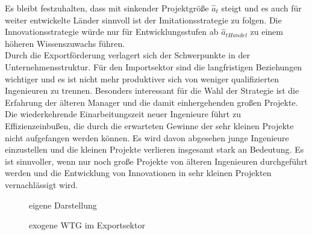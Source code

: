 %
Es bleibt festzuhalten, dass mit sinkender Projektgröße  $\hat{a}_t$ steigt und es auch für weiter entwickelte Länder sinnvoll ist der \textcolor[rgb]{0,0.32,0}{Imitationsstrategie} zu folgen. Die \textcolor[rgb]{0.74,0.97,0.22}{Innovationsstrategie} würde nur für Entwicklungsstufen ab $\hat{a}_{tHandel}$ zu einem höheren Wissenszuwachs führen. \\
%
Durch die Exportförderung verlagert sich der Schwerpunkte in der Unternehmensstruktur. Für den Importsektor sind die langfristigen Beziehungen wichtiger und es ist nicht mehr produktiver sich von weniger qualifizierten Ingenieuren zu trennen. Besonders interessant für die Wahl der Strategie ist die Erfahrung der älteren Manager und die damit einhergehenden großen Projekte. Die wiederkehrende Einarbeitungszeit neuer Ingenieure führt zu Effizienzeinbußen, die durch die erwarteten Gewinne der sehr kleinen Projekte nicht aufgefangen werden können. Es wird davon abgesehen junge Ingenieure einzustellen und die kleinen Projekte verlieren insgesamt stark an Bedeutung. Es ist sinnvoller, wenn nur noch große Projekte von älteren Ingenieuren durchgeführt werden und die Entwicklung von Innovationen in sehr kleinen Projekten vernachlässigt wird.\\
%
	\begin{figure*}[htb]
		\hfill{}  eigene Darstellung
		\caption{exogene WTG im Exportsektor}
		\label{fig:exogene WTG Exportsektor}
	\end{figure*}
